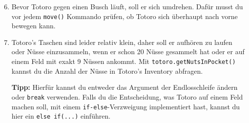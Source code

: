 \begin{enumerate}\setcounter{enumi}{5}
	\item
	Bevor Totoro gegen einen Busch läuft, soll er sich umdrehen.
	Dafür musst du vor jedem \lstinline{move()} Kommando prüfen, ob Totoro sich überhaupt nach vorne bewegen kann.
	
	\item
	Totoro's Taschen sind leider relativ klein, daher soll er 
	aufhören zu laufen oder Nüsse einzusammeln, wenn er schon 20 Nüsse gesammelt hat oder  er auf einem Feld mit exakt 9 Nüssen ankommt.
	Mit \lstinline{totoro.getNutsInPocket()} kannst du die Anzahl der Nüsse in Totoro's Inventory abfragen.
	
	\textbf{Tipp:} Hierfür kannst du entweder das Argument der Endlosschleife ändern oder \lstinline{break} verwenden.
	Falls du die Entscheidung, was Totoro auf einem Feld machen soll, mit einem \lstinline{if-else}-Verzweigung implementiert hast, kannst du hier ein \lstinline{else if(...)} einführen.
\end{enumerate}
\newpage
